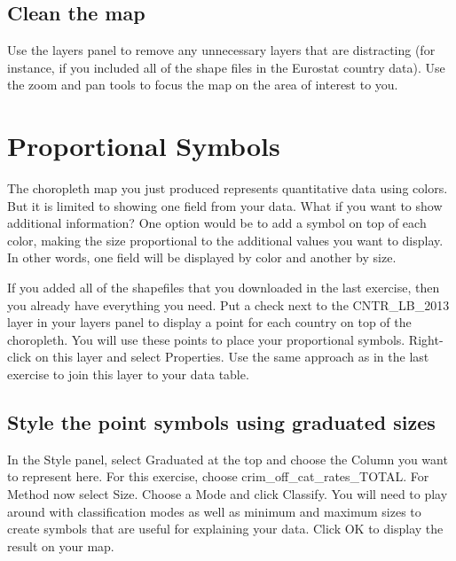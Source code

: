 \documentclass[]{book}
\begin{document}
\hypertarget{clean-the-map}{%
\subsection{Clean the map}\label{clean-the-map}}

Use the layers panel to remove any unnecessary layers that are distracting (for instance, if you included all of the shape files in the Eurostat country data). Use the zoom and pan tools to focus the map on the area of interest to you.

\hypertarget{proportional-symbols}{%
\section{Proportional Symbols}\label{proportional-symbols}}

The choropleth map you just produced represents quantitative data using colors. But it is limited to showing one field from your data. What if you want to show additional information? One option would be to add a symbol on top of each color, making the size proportional to the additional values you want to display. In other words, one field will be displayed by color and another by size.

If you added all of the shapefiles that you downloaded in the last exercise, then you already have everything you need. Put a check next to the CNTR\_LB\_2013 layer in your layers panel to display a point for each country on top of the choropleth. You will use these points to place your proportional symbols. Right-click on this layer and select Properties. Use the same approach as in the last exercise to join this layer to your data table.

\hypertarget{style-the-point-symbols-using-graduated-sizes}{%
\subsection{Style the point symbols using graduated sizes}\label{style-the-point-symbols-using-graduated-sizes}}

In the Style panel, select Graduated at the top and choose the Column you want to represent here. For this exercise, choose crim\_off\_cat\_rates\_TOTAL. For Method now select Size. Choose a Mode and click Classify. You will need to play around with classification modes as well as minimum and maximum sizes to create symbols that are useful for explaining your data. Click OK to display the result on your map.
\end{document}
